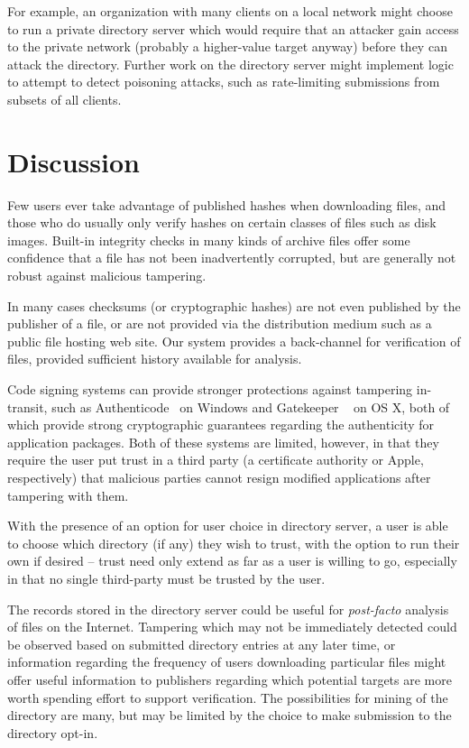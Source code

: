 \documentclass[letterpaper,twocolumn,10pt]{article}
\begin{document}
For example,
an organization with many clients on a local network might choose to run a private directory
server which would require that an attacker gain access to the private network (probably
a higher-value target anyway) before they can attack the directory.
Further work on the directory server might implement logic to attempt to detect
poisoning attacks, such as rate-limiting submissions from subsets of all clients.

\section{Discussion}

Few users ever take advantage of published hashes when downloading files, and those
who do usually only verify hashes on certain classes of files such as disk images.
Built-in integrity checks in many kinds of archive files
offer some confidence that a file has not been inadvertently corrupted,
but are generally not robust against malicious tampering.

In many cases checksums (or cryptographic hashes) are not even published by the
publisher of a file, or are not provided via the distribution medium such as a public
file hosting web site. Our system provides a back-channel for verification of files,
provided sufficient history available for analysis.

Code signing systems can provide stronger protections against tampering in-transit,
such as Authenticode~\cite{Authenticode} on Windows and Gatekeeper
~\cite{Gatekeeper} on OS X, both of which provide strong cryptographic
guarantees regarding the authenticity for application packages. Both of these
systems are limited, however, in that they require the user put trust in a third party
(a certificate authority or Apple, respectively) that malicious parties cannot resign
modified applications after tampering with them.

With the presence of an option for user choice in directory server, a user
is able to choose which directory (if any) they wish to trust, with the option
to run their own if desired -- trust need only extend as far as a user is willing
to go, especially in that no single third-party must be trusted by the user.

The records stored in the directory server could be useful for \emph{post-facto} analysis
of files on the Internet. Tampering which may not be immediately detected could be
observed based on submitted directory entries at any later time, or information
regarding the frequency of users downloading particular files might offer useful information
to publishers regarding which potential targets are more worth spending effort
to support verification. The possibilities for mining of the directory are many, but
may be limited by the choice to make submission to the directory opt-in.
\end{document}
